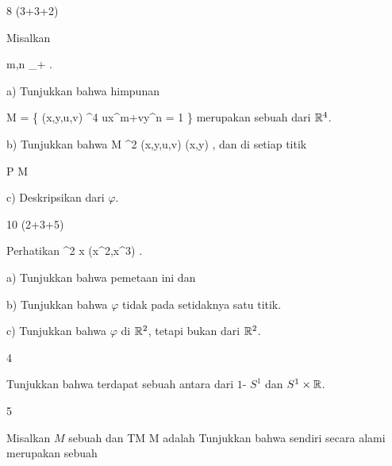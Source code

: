 {8 (3+3+2)}
{

Misalkan

\mavergleichskette
{\vergleichskette
{ m,n
}
{ \in }{\N_+
}
{  }{
}
{    }{
}
{   }{
}
}
{}{}{.}

a) Tunjukkan bahwa himpunan

\mavergleichskettedisp
{\vergleichskette
{ M
}
{ =} { \left\{ (x,y,u,v) \in \R^4  \mid  ux^m+vy^n = 1         \right\}
}
{ } {
}
{ } {
}
{ } {
}
}
{}{}{}
merupakan sebuah
dari ${\mathbb R}^4$.

b) Tunjukkan bahwa
\maabbeledisp {\varphi} { M } {\R^2
} {(x,y,u,v)} {(x,y)
} {,}
dan di setiap titik

\mavergleichskette
{\vergleichskette
{ P
}
{ \in }{ M
}
{  }{
}
{    }{
}
{   }{
}
}
{}{}{}

c) Deskripsikan
dari $\varphi$.

}
{} {}

{10 (2+3+5)}
{

Perhatikan
\maabbeledisp {\varphi} {\R} {\R^2
} { x } {(x^2,x^3)
} {.}

a) Tunjukkan bahwa pemetaan ini
dan

b) Tunjukkan bahwa $\varphi$ tidak
pada setidaknya satu titik.

c) Tunjukkan bahwa
$\varphi$
di ${\mathbb R}^2$, tetapi bukan
dari ${\mathbb R}^2$.

}
{} {}

{4}
{

Tunjukkan bahwa terdapat sebuah
antara
 dari
$1$- $S^1$ dan
 $S^1 \times {\mathbb R}$.

}
{} {}

{5}
{

Misalkan $M$ sebuah
dan
\maabbdisp {\pi} {TM} {M
} {}
adalah
Tunjukkan bahwa
 sendiri secara alami merupakan sebuah

}
{} {}

